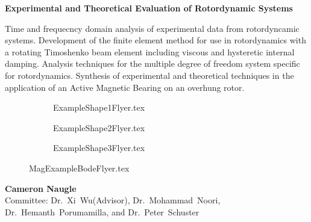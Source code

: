 \documentclass[20pt]{article}
\begin{document}
		\begin{center}
			{\LARGE \textbf{ Experimental and Theoretical Evaluation of Rotordynamic Systems}}\\
			\vspace{0.5cm}
			\begin{justify}
			Time and frequecncy domain analysis of experimental data from rotordyncamic systems. Development of the finite element method for use in rotordynamics with a rotating Timoshenko beam element including viscous and hysteretic internal damping. Analysis techniques for the multiple degree of freedom system specific for rotordynamics. Synthesis of experimental and theoretical techniques in the application of an Active Magnetic Bearing on an overhung rotor.\\
			\end{justify}
			\vspace{-.5cm}
\begin{figure}[h!]
	\def\cs{.3}	
	\def\over{3em}
	\def\hl{3em}
	\begin{subfigure}{\cs\textwidth}
		\centering
		\def\width{\linewidth+\over}
		\def\height{\linewidth-\hl}
		{ExampleShape1Flyer.tex}
	\end{subfigure}
	\begin{subfigure}{\cs\textwidth}
		\centering
		\def\width{\linewidth+\over}
		\def\height{\linewidth-\hl}
		{ExampleShape2Flyer.tex}
	\end{subfigure}
	\begin{subfigure}{\cs\textwidth}
		\centering
		\def\width{\linewidth+\over}
		\def\height{\linewidth-\hl}
		{ExampleShape3Flyer.tex}
	\end{subfigure}
\end{figure}
\vspace{-.8cm}
\begin{figure}[h!]
	\centering
	\def\sep{3em}
	\def\width{.55\linewidth}
	\def\height{.25\linewidth}
	{MagExampleBodeFlyer.tex}
\end{figure}
			\textbf{Cameron Naugle}\\
			Committee: \mbox{Dr. Xi Wu(Advisor)}, \mbox{Dr. Mohammad Noori}, \mbox{Dr. Hemanth Porumamilla}, and \mbox{Dr. Peter Schuster}
			\vfill
			

\end{center}
\end{document}
